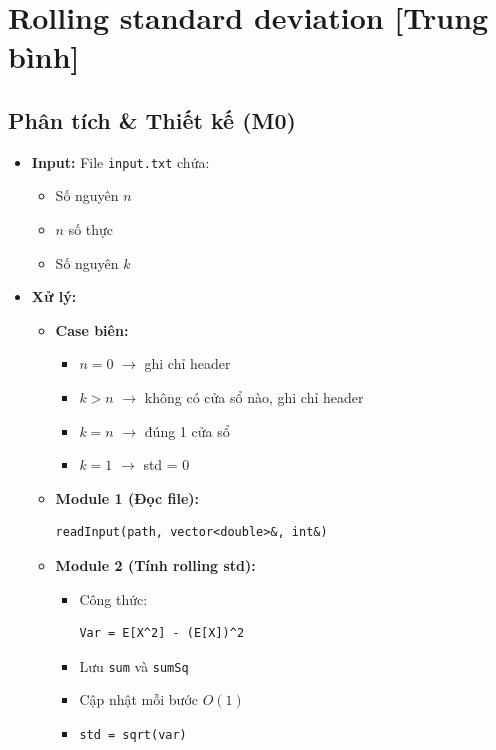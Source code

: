 \section{Rolling standard deviation [Trung bình]}
\subsection{Phân tích \& Thiết kế (M0)}

\begin{itemize}
    \item \textbf{Input:} File \texttt{input.txt} chứa:
    \begin{itemize}
        \item Số nguyên $n$
        \item $n$ số thực
        \item Số nguyên $k$
    \end{itemize}

    \item \textbf{Xử lý:}
    \begin{itemize}
        \item \textbf{Case biên:}
        \begin{itemize}
            \item $n=0$ $\rightarrow$ ghi chỉ header
            \item $k>n$ $\rightarrow$ không có cửa sổ nào, ghi chỉ header
            \item $k=n$ $\rightarrow$ đúng 1 cửa sổ
            \item $k=1$ $\rightarrow$ std = 0
        \end{itemize}

        \item \textbf{Module 1 (Đọc file):}
\begin{lstlisting}
readInput(path, vector<double>&, int&)
\end{lstlisting}

        \item \textbf{Module 2 (Tính rolling std):}
        \begin{itemize}
            \item Công thức:
\begin{lstlisting}
Var = E[X^2] - (E[X])^2
\end{lstlisting}
            \item Lưu \texttt{sum} và \texttt{sumSq}
            \item Cập nhật mỗi bước $O(1)$
            \item \texttt{std = sqrt(var)}
        \end{itemize}


\end{itemize}
\end{itemize}
